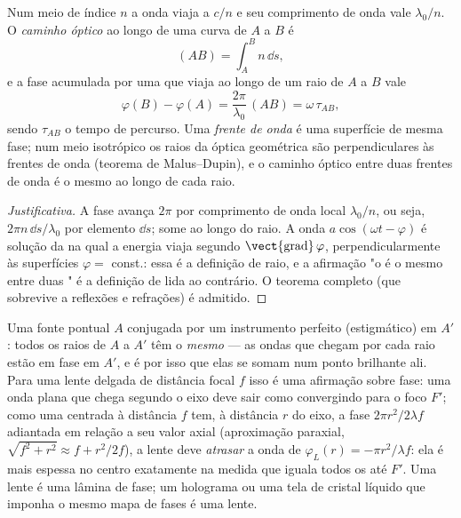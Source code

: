 \begin{definition}\label{def:b2:scalar-light-model:path}
Num meio de índice $n$ a onda viaja a $c/n$ e seu comprimento de onda
vale $\lambda_0/n$. O \emph{caminho óptico} ao longo de uma curva de $A$ a $B$ é
\[
(AB) = \int_A^Bn\,\dd s ,
\]
e a fase acumulada por uma  que viaja ao longo de um
raio de $A$ a $B$ vale
\[
\varphi(B) - \varphi(A) = \frac{2\pi}{\lambda_0}\,(AB) = \omega\,\tau_{AB} ,
\]
sendo $\tau_{AB}$ o tempo de percurso. Uma \emph{frente de onda} é uma superfície de
mesma fase; num meio isotrópico os raios da óptica geométrica são
perpendiculares às frentes de onda (teorema de Malus--Dupin), e o caminho
óptico entre duas frentes de onda é o mesmo ao longo de cada raio.
\end{definition}

\begin{proof}[Justificativa]
A fase avança $2\pi$ por comprimento de onda local $\lambda_0/n$, ou seja,
$2\pi n\,\dd s/\lambda_0$ por elemento $\dd s$; some ao longo do raio. A onda
$a\cos(\omega t - \varphi)$ é solução da  na qual a
energia viaja segundo $\operatorname{\vect{grad}}\varphi$, perpendicularmente às
superfícies $\varphi = $ const.: essa é a definição de raio, e a afirmação "o  é o mesmo entre duas " é a definição de 
lida ao contrário. O teorema completo (que sobrevive a reflexões e
refrações) é admitido.
\end{proof}

\begin{example}\label{ex:b2:scalar-light-model:lens}
Uma fonte pontual $A$ conjugada por um instrumento perfeito (estigmático) em $A'$:
todos os raios de $A$ a $A'$ têm o \emph{mesmo } --- as
ondas que chegam por cada raio estão em fase em $A'$, e é por isso que elas
se somam num ponto brilhante ali. Para uma lente delgada de distância focal $f$
isso é uma afirmação sobre fase: uma onda plana que chega segundo o eixo
deve sair como  convergindo para o foco $F'$; como uma
 centrada à distância $f$ tem, à distância $r$ do eixo,
a fase $2\pi r^2/2\lambda f$ adiantada em relação a seu valor axial (aproximação
paraxial, $\sqrt{f^2 + r^2} \approx f + r^2/2f$), a lente deve
\emph{atrasar} a onda de $\varphi_L(r) = -\pi r^2/\lambda f$: ela é mais espessa no
centro exatamente na medida que iguala todos os  até $F'$.
Uma lente é uma lâmina de fase; um holograma ou uma tela de cristal líquido
que imponha o mesmo mapa de fases é uma lente.
\end{example}

